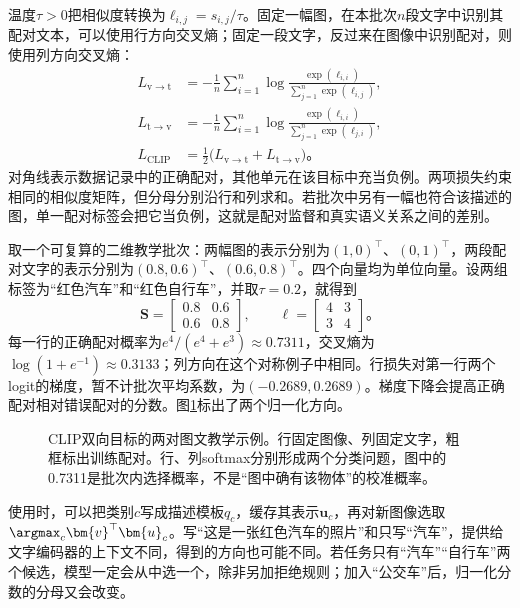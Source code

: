 温度$\tau>0$把相似度转换为$\ell_{i,j}=s_{i,j}/\tau$。固定一幅图，在本批次$n$段文字中识别其配对文本，可以使用行方向交叉熵；固定一段文字，反过来在图像中识别配对，则使用列方向交叉熵：
\begin{equation}
  \begin{aligned}
    L_{\mathrm{v\to t}}
      &=-\frac1n\sum_{i=1}^n
        \log\frac{\exp(\ell_{i,i})}{\sum_{j=1}^n\exp(\ell_{i,j})},\\
    L_{\mathrm{t\to v}}
      &=-\frac1n\sum_{i=1}^n
        \log\frac{\exp(\ell_{i,i})}{\sum_{j=1}^n\exp(\ell_{j,i})},\\
    L_{\mathrm{CLIP}}&=\tfrac12
        \bigl(L_{\mathrm{v\to t}}+L_{\mathrm{t\to v}}\bigr)\text{。}
  \end{aligned}
  \label{eq:vision-clip-loss}
\end{equation}
对角线表示数据记录中的正确配对，其他单元在该目标中充当负例。两项损失约束相同的相似度矩阵，但分母分别沿行和列求和。若批次中另有一幅也符合该描述的图，单一配对标签会把它当负例，这就是配对监督和真实语义关系之间的差别。

取一个可复算的二维教学批次：两幅图的表示分别为$(1,0)^\top$、$(0,1)^\top$，两段配对文字的表示分别为$(0.8,0.6)^\top$、$(0.6,0.8)^\top$。四个向量均为单位向量。设两组标签为“红色汽车”和“红色自行车”，并取$\tau=0.2$，就得到
\[
  \bm{S}=\begin{bmatrix}0.8&0.6\\0.6&0.8\end{bmatrix},
  \qquad
  \bm{\ell}=\begin{bmatrix}4&3\\3&4\end{bmatrix}\text{。}
\]
每一行的正确配对概率为$e^4/(e^4+e^3)\approx0.7311$，交叉熵为$\log(1+e^{-1})\approx0.3133$；列方向在这个对称例子中相同。行损失对第一行两个logit的梯度，暂不计批次平均系数，为$(-0.2689,0.2689)$。梯度下降会提高正确配对相对错误配对的分数。图\ref{fig:vision-clip-matrix}标出了两个归一化方向。

\begin{figure}[htbp]
  \centering
  
  \caption{CLIP双向目标的两对图文教学示例。行固定图像、列固定文字，粗框标出训练配对。行、列softmax分别形成两个分类问题，图中的0.7311是批次内选择概率，不是“图中确有该物体”的校准概率。}
  \label{fig:vision-clip-matrix}
\end{figure}

使用时，可以把类别$c$写成描述模板$q_c$，缓存其表示$\bm{u}_c$，再对新图像选取$\argmax_c\bm{v}^\top\bm{u}_c$。写“这是一张红色汽车的照片”和只写“汽车”，提供给文字编码器的上下文不同，得到的方向也可能不同。若任务只有“汽车”“自行车”两个候选，模型一定会从中选一个，除非另加拒绝规则；加入“公交车”后，归一化分数的分母又会改变。

